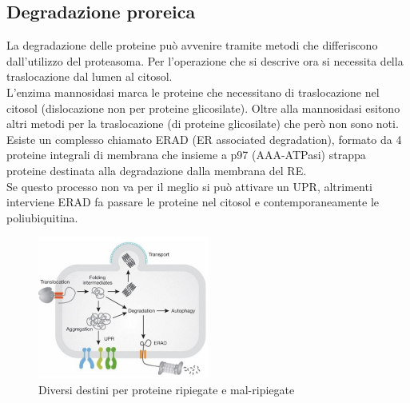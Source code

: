     \subsection{Degradazione proreica}
        La degradazione delle proteine può avvenire tramite metodi che differiscono dall'utilizzo del proteasoma. Per l'operazione che si descrive ora si necessita della traslocazione dal lumen al citosol.\\
        L'enzima mannosidasi marca le proteine che necessitano di traslocazione nel citosol (dislocazione non per proteine glicosilate). Oltre alla mannosidasi esitono altri metodi per la traslocazione (di proteine glicosilate) che però non sono noti.\\
        Esiste un complesso chiamato ERAD (ER associated degradation), formato da 4 proteine integrali di membrana che insieme a p97 (AAA-ATPasi) strappa proteine destinata alla degradazione dalla membrana del RE. \\
        Se questo processo non va per il meglio si può attivare un UPR, altrimenti interviene ERAD fa passare le proteine nel citosol e contemporaneamente le poliubiquitina.
        \begin{figure}[h]
            \centering
            \includegraphics[width=0.5\textwidth]{images/degradazione.JPG}
            \caption{\small Diversi destini per proteine ripiegate e mal-ripiegate}
            \label{fig:mesh1}
        \end{figure}

\pagebreak